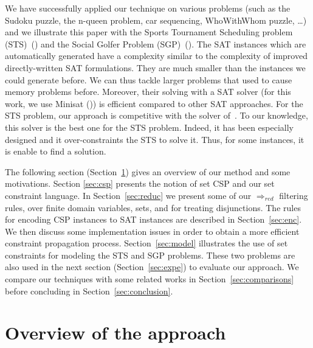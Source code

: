 \documentclass[3p,authoryear,times]{elsarticle}
\newcommand{\rmin}[0]{{\Rightarrow_{red}}}
\begin{document}
We have successfully applied our technique on various problems (such as the Sudoku puzzle, the n-queen problem, car sequencing, WhoWithWhom puzzle, \ldots) and we illustrate this paper with the Sports Tournament Scheduling problem (STS)~(\cite{sts}) and the Social Golfer Problem (SGP)~(\cite{sgp}). The SAT instances which are automatically generated have a complexity similar to the complexity of improved directly-written SAT formulations. 
They are much smaller than the instances we could generate before. We can thus tackle larger problems that used to cause memory problems before. Moreover, their solving with a SAT solver (for this work, we use Minisat (\cite{minisat03})) is efficient compared to other SAT approaches. 
For the STS problem, our approach is competitive with the solver of~\cite{hamiez14}. To our knowledge, this solver is the best one for the STS problem. Indeed, it has been especially designed and it over-constraints the STS to solve it. Thus, for some instances, it is enable to find a solution.




\medskip

The following section  (Section~\ref{sec:overview}) gives an overview of our method and some motivations.
Section \ref{sec:csp} presents the notion of set CSP and our set constraint language.
In Section~\ref{sec:reduc} we present some of our $\rmin$ filtering rules, over finite domain variables, sets, and for treating disjunctions. The rules for encoding CSP instances to SAT instances are described in Section~\ref{sec:enc}. We then discuss some implementation issues  in order to obtain a more efficient constraint propagation process. 
Section~\ref{sec:model} illustrates the use of set constraints for modeling the STS and SGP problems. These two problems are also used in the next section (Section~\ref{sec:expe}) to evaluate our approach. We compare our techniques with some related works in Section~\ref{sec:comparisons} before concluding in Section~\ref{sec:conclusion}.

\color{black}

\section{Overview of the approach}
\label{sec:overview}
\end{document}
